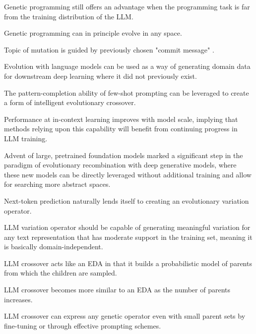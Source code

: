 Genetic programming still offers an advantage when the programming task is far from the training distribution of the LLM. \cite{lehman2022evolutionlargemodels}

Genetic programming can in principle evolve in any space. \cite{lehman2022evolutionlargemodels}


Topic of mutation is guided by previously chosen "commit message" . \cite{lehman2022evolutionlargemodels}

Evolution with language models can be used as a way of generating domain data for downstream deep learning where it did not previously exist. \cite{lehman2022evolutionlargemodels}


The pattern-completion ability of few-shot prompting can be leveraged to create a form of intelligent evolutionary crossover. \cite{meyerson2024languagemodelcrossovervariation}

Performance at in-context learning improves with model scale, implying that methods relying upon this capability will benefit from continuing progress in LLM training. \cite{meyerson2024languagemodelcrossovervariation}

Advent of large, pretrained foundation models marked a significant step in the paradigm of evolutionary 
recombination with deep generative models, where these new models can be directly leveraged without additional training and allow for searching more abstract spaces. \cite{meyerson2024languagemodelcrossovervariation}

Next-token prediction naturally lends itself to creating an evolutionary variation operator. \cite{meyerson2024languagemodelcrossovervariation}

LLM variation operator should be capable of generating meaningful variation for any text representation that has moderate support in the training set, meaning it is basically domain-independent. \cite{meyerson2024languagemodelcrossovervariation}

LLM crossover acts like an EDA in that it builds a probabilistic model of parents from which the children are sampled. \cite{meyerson2024languagemodelcrossovervariation}

LLM crossover becomes more similar to an EDA as the number of parents increases. \cite{meyerson2024languagemodelcrossovervariation}

LLM crossover can express any genetic operator even with small parent sets by fine-tuning or through effective prompting schemes. \cite{meyerson2024languagemodelcrossovervariation}

